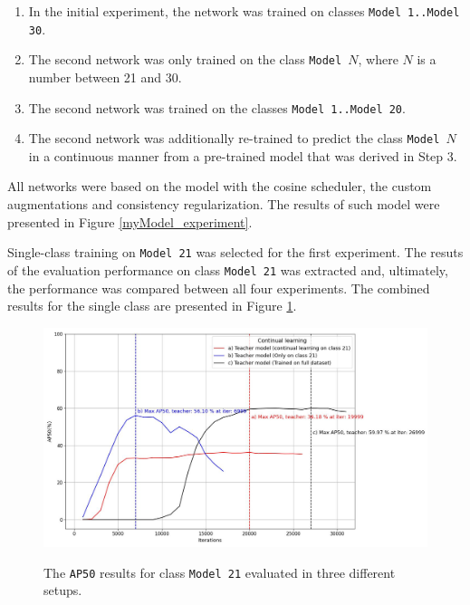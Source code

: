 \begin{enumerate}
\item In the initial experiment, the network was trained on classes \texttt{Model 1..Model 30}.
\item The second network was only trained on the class \texttt{Model $N$}, where $N$ is a number between 21 and 30.
\item The second network was trained on the classes \texttt{Model 1..Model 20}.
\item The second network was additionally re-trained to predict the class \texttt{Model $N$} in a continuous manner from a pre-trained model that was derived in Step 3.
\end{enumerate} 

All networks were based on the model with the cosine scheduler, the custom augmentations and   consistency regularization. The results of such model were presented in Figure \ref{myModel_experiment}.

Single-class training on \texttt{Model 21} was selected for the first experiment. The resuts of the evaluation performance on class \texttt{Model 21} was extracted and, ultimately, the performance was compared between all four experiments. The combined results for the single class are presented in Figure  \ref{myModel_continuous_experiment_1}.
\FloatBarrier

\begin{figure}[htb]
	\begin{center}
		\includegraphics[width=16cm]{./AP50_continual_21.jpg}
	\end{center}
	\caption{The \texttt{AP50} results for class \texttt{Model 21} evaluated in three different setups.}
	\begin{center}
		\label{myModel_continuous_experiment_1}
	\end{center}
\end{figure}


